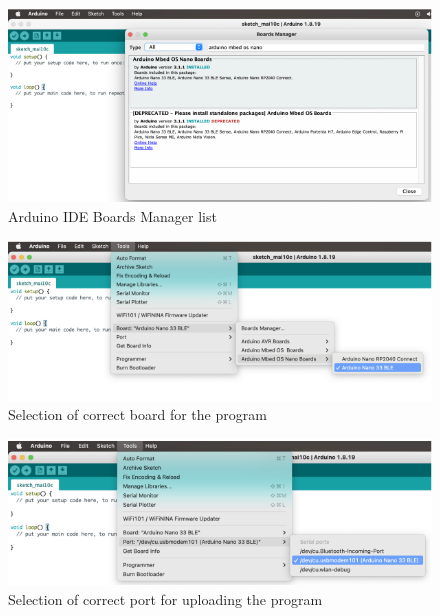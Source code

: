 \begin{figure}[h!]
	\centering
	\includegraphics[width=1.0\textwidth]{Images/Deployment/Arduino-IDE-Boards-Manager-list}
	\caption{Arduino IDE Boards Manager list} \label{fig:Arduino-IDE-Boards-Manager-list}
\end{figure}

\begin{figure}[h!]
	\centering
	\includegraphics[width=1.0\textwidth]{Images/Deployment/Selection-of-correct-board-for-the-program}
	\caption{Selection of correct board for the program} 
	\label{fig:Selection-of-correct-board-for-the-program}
\end{figure}

\begin{figure}[h!]
	\centering
	\includegraphics[width=1.0\textwidth]{Images/Deployment/Selection-of-correct-port-for-uploading-the-program}
	\caption{Selection of correct port for uploading the program} 
	\label{fig:Selection-of-correct-port-for-uploading-the-program}
\end{figure}

